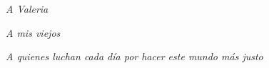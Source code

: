 \hfill

\textit{A Valeria}

\textit{A mis viejos}

\textit{A quienes luchan cada día por hacer este mundo más justo}

